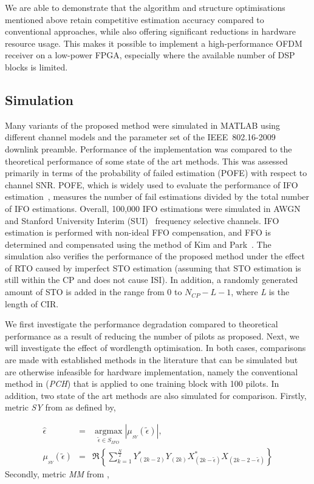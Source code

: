 We are able to demonstrate that the algorithm and structure optimisations mentioned above retain competitive estimation accuracy compared to conventional approaches, while also offering significant reductions in hardware resource usage.
This makes it possible to implement a high-performance OFDM receiver on a low-power FPGA, especially where the available number of DSP blocks is limited.

\subsection{Simulation}
\label{sec:Sim}
Many variants of the proposed method were simulated in MATLAB using different channel models and the parameter set of the IEEE~802.16-2009 downlink preamble. Performance of the implementation was compared to the theoretical performance of some state of the art methods.
This was assessed primarily in terms of the probability of failed estimation (POFE) with respect to channel SNR.
POFE, which is widely used to evaluate the performance of IFO estimation~\cite{Park2002,Shim2006,Morelli2008}, measures the number of fail estimations divided by the total number of IFO estimations.
Overall, 100,000 IFO estimations were simulated in AWGN and Stanford University Interim (SUI)~\cite{V.ErcegJuly2003} frequency selective channels.
IFO estimation is performed with non-ideal FFO compensation, and FFO is determined and compensated using the method of Kim and Park~\cite{Kim2008}.
The simulation also verifies the performance of the proposed method under the effect of RTO caused by imperfect STO estimation (assuming that STO estimation is still within the CP and does not cause ISI).
In addition, a randomly generated amount of STO is added in the range from 0 to $N_{CP}-L-1$, where \emph{L} is the length of CIR.

We first investigate the performance degradation compared to theoretical performance as a result of reducing the number of pilots as proposed. Next, we will investigate the effect of wordlength optimisation.
In both cases, comparisons are made with established methods in the literature that can be simulated but are otherwise infeasible for hardware implementation, namely the conventional method in \cite{Park2002} (\emph{PCH}) that is applied to one training block with 100 pilots.
In addition,  two state of the art methods are also simulated for comparison. 
Firstly, metric \emph{SY} from \cite{Shim2006} as defined by,

\begin{eqnarray}
\label{equ:SY}
\hat{\epsilon} &=&\underset{\tilde{\epsilon} \in S_{IFO}}{\operatorname{argmax}} \left| \mu_{_{SY}}(\tilde{\epsilon})  \right|,	 \nonumber \\
\mu_{_{SY}}(\tilde{\epsilon}) &=& \Re{\left\{\sum_{k=1}^{\frac{N}{2}} Y^{*}_{(2k-2)} Y_{(2k)}  X^{*}_{(2k-\tilde{\epsilon})} X_{(2k-2-\tilde{\epsilon})}\right\}}
\end{eqnarray}
Secondly, metric \emph{MM} from \cite{Morelli2008},


